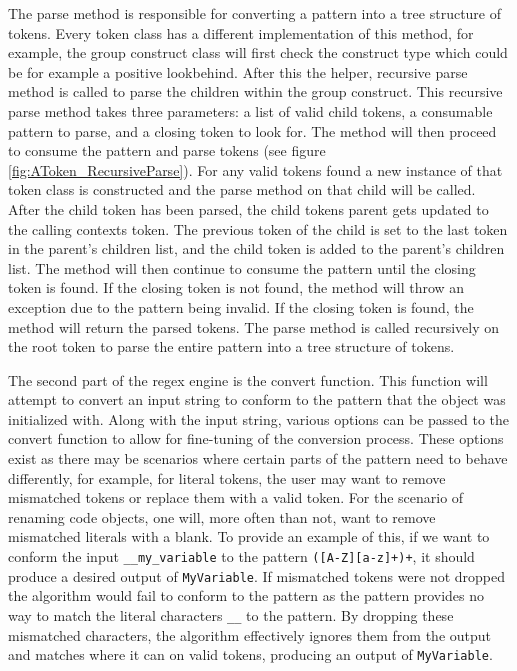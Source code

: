The parse method is responsible for converting a pattern into a tree structure of tokens. Every token class has a different implementation of this method, for example, the group construct class will first check the construct type which could be for example a positive lookbehind. After this the helper, recursive parse method is called to parse the children within the group construct. This recursive parse method takes three parameters: a list of valid child tokens, a consumable pattern to parse, and a closing token to look for. The method will then proceed to consume the pattern and parse tokens (see figure \ref{fig:AToken_RecursiveParse}). For any valid tokens found a new instance of that token class is constructed and the parse method on that child will be called. After the child token has been parsed, the child tokens parent gets updated to the calling contexts token. The previous token of the child is set to the last token in the parent's children list, and the child token is added to the parent's children list. The method will then continue to consume the pattern until the closing token is found. If the closing token is not found, the method will throw an exception due to the pattern being invalid. If the closing token is found, the method will return the parsed tokens. The parse method is called recursively on the root token to parse the entire pattern into a tree structure of tokens.

The second part of the regex engine is the convert function. This function will attempt to convert an input string to conform to the pattern that the object was initialized with.
Along with the input string, various options can be passed to the convert function to allow for fine-tuning of the conversion process. These options exist as there may be scenarios where certain parts of the pattern need to behave differently, for example, for literal tokens, the user may want to remove mismatched tokens or replace them with a valid token.
For the scenario of renaming code objects, one will, more often than not, want to remove mismatched literals with a blank. To provide an example of this, if we want to conform the input \texttt{\_\_my\_variable} to the pattern \texttt{([A-Z][a-z]+)+}, it should produce a desired output of \texttt{MyVariable}. If mismatched tokens were not dropped the algorithm would fail to conform to the pattern as the pattern provides no way to match the literal characters \texttt{\_\_} to the pattern. By dropping these mismatched characters, the algorithm effectively ignores them from the output and matches where it can on valid tokens, producing an output of \texttt{MyVariable}.

